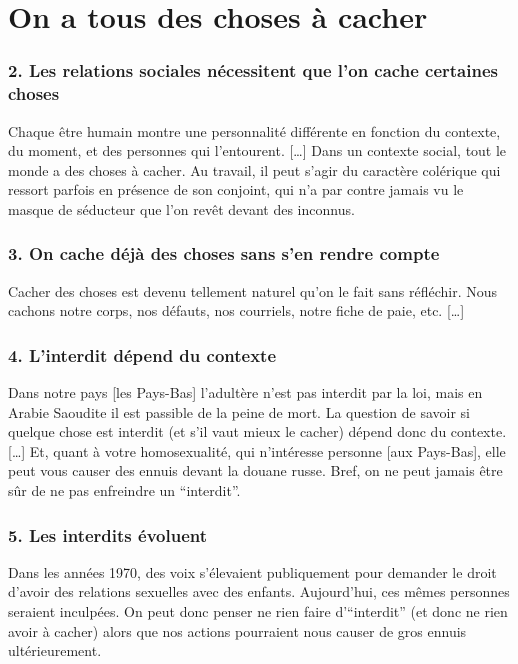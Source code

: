 \section{On a tous des choses à cacher}

\subsubsection{2. Les relations sociales nécessitent que l'on cache certaines choses}
Chaque être humain montre une personnalité différente en fonction du contexte, du moment, et des personnes qui l'entourent. […]
Dans un contexte social, tout le monde a des choses à cacher. Au travail, il peut s'agir du caractère colérique qui ressort parfois en présence de son conjoint, qui n'a par contre jamais vu le masque de séducteur que l'on revêt devant des inconnus.

\subsubsection{3. On cache déjà des choses sans s'en rendre compte}
Cacher des choses est devenu tellement naturel qu'on le fait sans réfléchir. Nous cachons notre corps, nos défauts, nos courriels, notre fiche de paie, etc. […]

\subsubsection{4. L'interdit dépend du contexte}
Dans notre pays [les Pays-Bas] l'adultère n'est pas interdit par la loi, mais en Arabie Saoudite il est passible de la peine de mort. La question de savoir si quelque chose est interdit (et s'il vaut mieux le cacher) dépend donc du contexte. […] Et, quant à votre homosexualité, qui n'intéresse personne [aux Pays-Bas], elle peut vous causer des ennuis devant la douane russe. Bref, on ne peut jamais être sûr de ne pas enfreindre un ``interdit''.

\subsubsection{5. Les interdits évoluent}
Dans les années 1970, des voix s'élevaient publiquement pour demander le droit d'avoir des relations sexuelles avec des enfants. Aujourd'hui, ces mêmes personnes seraient inculpées. On peut donc penser ne rien faire d'``interdit'' (et donc ne rien avoir à cacher) alors que nos actions pourraient nous causer de gros ennuis ultérieurement.

